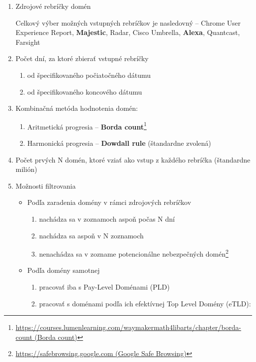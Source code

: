 \begin{enumerate}
    \item Zdrojové rebríčky domén
    
    Celkový výber možných vstupných rebríčkov je nasledovný -- Chrome User Experience Report, \textbf{Majestic}, Radar, Cisco Umbrella, \textbf{Alexa}, Quantcast, Farsight
    
    \item Počet dní, za ktoré zbierať vstupné rebríčky
    \begin{enumerate}
        \item od špecifikovaného počiatočného dátumu
        \item od špecifikovaného koncového dátumu
    \end{enumerate}

    \item Kombinačná metóda hodnotenia domén:
    \begin{enumerate}
        \item Aritmetická progresia -- \textbf{Borda count}\footnote{\href{https://courses.lumenlearning.com/waymakermath4libarts/chapter/borda-count}{https://courses.lumenlearning.com/waymakermath4libarts/chapter/borda-count (Borda count)}}
        \item Harmonická progresia -- \textbf{Dowdall rule} (štandardne zvolená)
    \end{enumerate}

    \item Počet prvých N domén, ktoré vziať ako vstup z každého rebríčka (štandardne milión)

    \item Možnosti filtrovania
    \begin{itemize}
        \item Podľa zaradenia domény v rámci zdrojových rebríčkov
        \begin{enumerate}
            \item nachádza sa v zoznamoch aspoň počas N dní
            \item nachádza sa aspoň v N zoznamoch
            \item nenachádza sa v zozname potencionálne nebezpečných domén\footnote{\href{https://safebrowsing.google.com}{https://safebrowsing.google.com (Google Safe Browsing)}}
        \end{enumerate}

        \item Podľa domény samotnej
        \begin{enumerate}
            \item pracovať iba s Pay-Level Doménami (PLD)
            \item pracovať s doménami podľa ich efektívnej Top Level Domény (eTLD):
            

\end{enumerate}
\end{itemize}
\end{enumerate}
